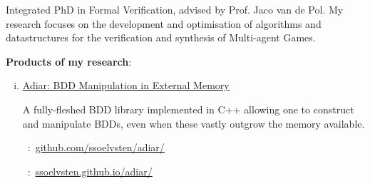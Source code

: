 
Integrated PhD in Formal Verification, advised by Prof. Jaco van de Pol. My
research focuses on the development and optimisation of algorithms and
datastructures for the verification and synthesis of Multi-agent Games.

\medskip

\textbf{Products of my research}:

\medskip

\hspace{1em}
\begin{minipage}{29.5em}
  \begin{flushleft}
    \begin{enumerate}[(i).]
      
    \item[\faCode]
      \href{http://github.com/ssoelvsten/adiar}{Adiar: BDD Manipulation in External Memory}

      \smallskip

      A fully-fleshed BDD library implemented in C++ allowing one to construct
      and manipulate BDDs, even when these vastly outgrow the memory available.

      \smallskip

      \faGit\ :\
      \href{https://github.com/ssoelvsten/adiar/}{github.com/ssoelvsten/adiar/}

      \faFileTextO\ :\
      \href{https://ssoelvsten.github.io/adiar/}{ssoelvsten.github.io/adiar/}
      
    \end{enumerate}
  \end{flushleft}
\end{minipage}

\medskip

